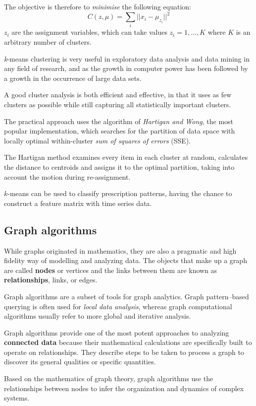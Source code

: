 The objective is therefore to \textit{minimise} the following equation:
$$C(z, \mu) = \sum_{i} ||x_i - \mu_{z_i}||^2$$
$z_i$ are the assignment variables, which can take values $z_i = 1, \dots, K$ where $K$ is an arbitrary number of clusters.

\textit{k}-means clustering is very useful in exploratory data analysis and data mining in any field of research, and as the growth in computer power has been followed by a growth in the occurrence of large data sets.
 
A good cluster analysis is both efficient and effective, in that it uses as few clusters as possible while still capturing all statistically important clusters.

The practical approach uses the algorithm of \textit{Hartigan and Wong}, the most popular implementation, which searches for the partition of data space with locally optimal within-cluster \textit{sum of squares of errors} (SSE).

The Hartigan method examines every item in each cluster at random, calculates the distance to centroids and assigns it to the optimal partition, taking into account the motion during re-assignment.

$k$-means can be used to classify prescription patterns, having the chance to construct a feature matrix with time series data.

\subsection{Graph algorithms}
While graphs originated in mathematics, they are also a pragmatic and high fidelity way of modelling and analyzing data. The objects that make up a graph are called \textbf{nodes} or vertices and the links between them are known as \textbf{relationships}, links, or edges. 

Graph algorithms are a subset of tools for graph analytics. Graph pattern–based querying is often used for \textit{local data analysis}, whereas graph computational algorithms usually refer to more global and iterative analysis.

Graph algorithms provide one of the most potent approaches to analyzing \textbf{connected data} because their mathematical calculations are specifically built to operate on relationships. They describe steps to be taken to process a graph to discover its general qualities or specific quantities. 

Based on the mathematics of graph theory, graph algorithms use the relationships between nodes to infer the organization and dynamics of complex systems\cite{neo4jbook}.

